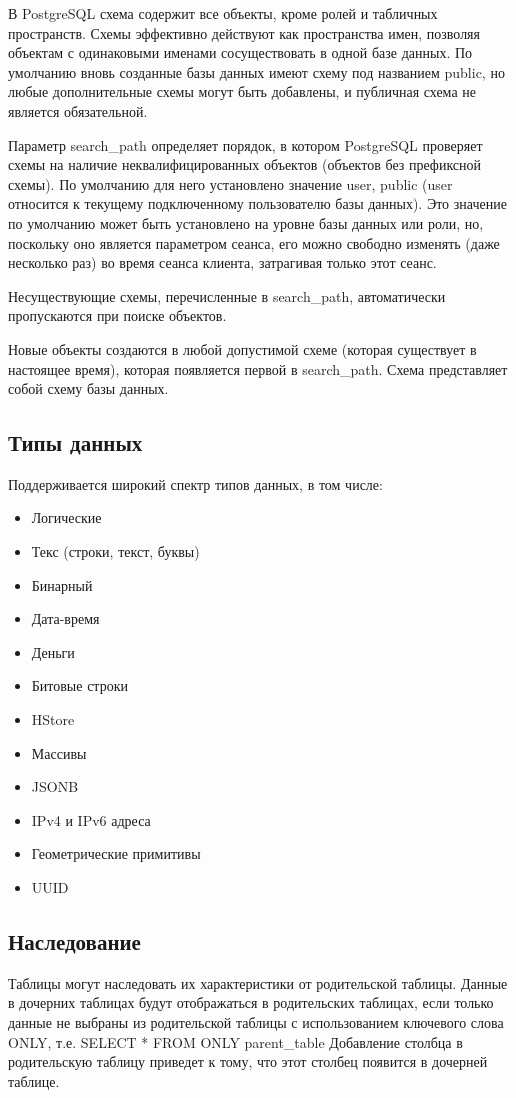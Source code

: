 В PostgreSQL схема содержит все объекты, кроме ролей и табличных пространств. Схемы эффективно действуют как пространства имен, позволяя объектам с одинаковыми именами сосуществовать в одной базе данных. По умолчанию вновь созданные базы данных имеют схему под названием public, но любые дополнительные схемы могут быть добавлены, и публичная схема не является обязательной.


Параметр search\_path определяет порядок, в котором PostgreSQL проверяет схемы на наличие неквалифицированных объектов (объектов без префиксной схемы). По умолчанию для него установлено значение user, public (user относится к текущему подключенному пользователю базы данных). Это значение по умолчанию может быть установлено на уровне базы данных или роли, но, поскольку оно является параметром сеанса, его можно свободно изменять (даже несколько раз) во время сеанса клиента, затрагивая только этот сеанс.


Несуществующие схемы, перечисленные в search\_path, автоматически пропускаются при поиске объектов.


Новые объекты создаются в любой допустимой схеме (которая существует в настоящее время), которая появляется первой в search\_path. Схема представляет собой схему базы данных.


\subsection{Типы данных}\label{sec:subs4}
Поддерживается широкий спектр типов данных, в том числе:

\begin{itemize}
  \item Логические
  \item Текс (строки, текст, буквы)
  \item Бинарный
  \item Дата-время
  \item Деньги
  \item Битовые строки
  \item HStore
  \item Массивы
  \item JSONB
  \item IPv4 и IPv6 адреса
  \item Геометрические примитивы
  \item UUID
\end{itemize}

\subsection{Наследование}\label{sec:subs5}
Таблицы могут наследовать их характеристики от родительской таблицы. Данные в дочерних таблицах будут отображаться в родительских таблицах, если только данные не выбраны из родительской таблицы с использованием ключевого слова ONLY, т.е. SELECT * FROM ONLY parent\_table Добавление столбца в родительскую таблицу приведет к тому, что этот столбец появится в дочерней таблице.


